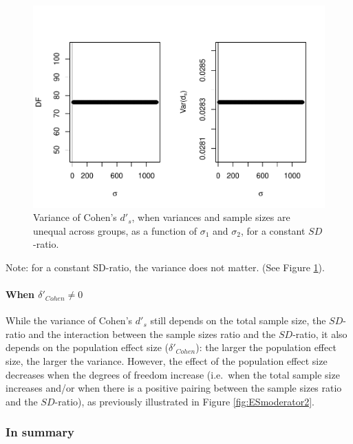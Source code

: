\documentclass[
  man]{apa6}
\begin{document}
\begin{figure}
\centering
\includegraphics{Theoretical-Variance-of-all-estimators-as-a-function-of-population-parameters_files/figure-latex/varcohendprimehetunbalvariance2-1.pdf}
\caption{\label{fig:varcohendprimehetunbalvariance2}Variance of Cohen's \(d'_s\), when variances and sample sizes are unequal across groups, as a function of \(\sigma_1\) and \(\sigma_2\), for a constant \(SD\)-ratio.}
\end{figure}

Note: for a constant SD-ratio, the variance does not matter. (See Figure \ref{fig:varcohendprimehetunbalvariance2}).

\hypertarget{when-delta_cohen-neq-0-2}{%
\paragraph{\texorpdfstring{When \(\delta'_{Cohen} \neq 0\)}{When \textbackslash delta'\_\{Cohen\} \textbackslash neq 0}}\label{when-delta_cohen-neq-0-2}}

While the variance of Cohen's \(d'_s\) still depends on the total sample size, the \(SD\)-ratio and the interaction between the sample sizes ratio and the \(SD\)-ratio, it also depends on the population effect size (\(\delta'_{Cohen}\)): the larger the population effect size, the larger the variance. However, the effect of the population effect size decreases when the degrees of freedom increase (i.e.~when the total sample size increases and/or when there is a positive pairing between the sample sizes ratio and the \(SD\)-ratio), as previously illustrated in Figure \ref{fig:ESmoderator2}.

\hypertarget{in-summary-2}{%
\subsubsection{In summary}\label{in-summary-2}}
\end{document}
